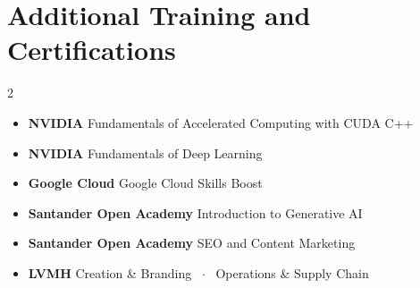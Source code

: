 \documentclass[10pt, letterpaper]{article}
\begin{document}
\section{Additional Training and Certifications}

\begin{multicols}{2}
\small
\begin{itemize}
    \item \textbf{NVIDIA} \textemdash{} Fundamentals of Accelerated Computing with CUDA C++
    \item \textbf{NVIDIA} \textemdash{} Fundamentals of Deep Learning
    \item \textbf{Google Cloud} \textemdash{} Google Cloud Skills Boost
    \item \textbf{Santander Open Academy} \textemdash{} Introduction to Generative AI
    \item \textbf{Santander Open Academy} \textemdash{} SEO and Content Marketing
    \item \textbf{LVMH} \textemdash{} Creation \& Branding \ $\cdot$ \ Operations \& Supply Chain
\end{itemize}
\end{multicols}
\end{document}
